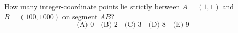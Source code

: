 How many integer-coordinate points lie strictly between $A=(1,1)$ and $B=(100,1000)$ on segment $AB$?
\[
\text{(A) }0\quad\text{(B) }2\quad\text{(C) }3\quad\text{(D) }8\quad\text{(E) }9
\]
